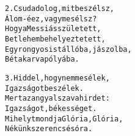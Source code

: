 \begin{minipage}{\textwidth}
\kottastart
{}
\kottaend
\begin{minipage}{\textwidth}
\begin{multicols}{2}
\begin{minipage}{\textwidth}
\begin{alltt}
2. Csuda dolog, mit beszélsz,
   Álom-é ez, vagy mesélsz?
   Hogy a Messiás született,
   Betlehembe helyeztetett,
   Egy rongyos istállóba, jászolba,
   Bétakarva pólyába.
\end{alltt}
\vspace{0.0cm}
\versszakspacing
\end{minipage}
\begin{minipage}{\textwidth}
\begin{alltt}
3. Hidd el, hogy nem mesélek,
   Igazságot beszélek.
   Mert az angyal szava hirdet:
   Igazságot, békességet.
   Mihelyt mondja Glória, Glória,
   Nékünk szerencsés óra.
\end{alltt}
\vspace{0.0cm}
\versszakspacing
\end{minipage}
\vspace{0.2cm}
\end{multicols}
\end{minipage}

\end{minipage}
~\vspace{1.0cm}
\newline

